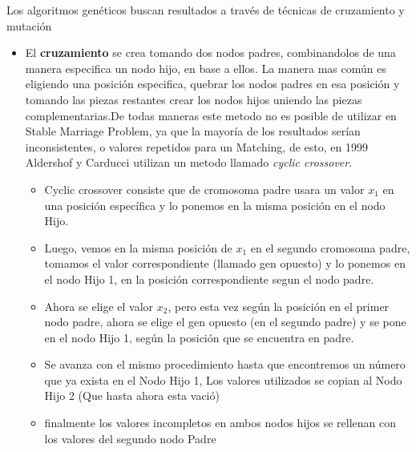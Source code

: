 \documentclass[letter, 10pt]{article}
\begin{document}
Los algoritmos gen\'eticos buscan resultados a trav\'es de t\'ecnicas de cruzamiento y mutaci\'on
\begin{itemize}
\item El \textbf{cruzamiento} se crea tomando dos nodos padres, combinandolos de una manera especifica un nodo hijo, en
base a ellos. La manera mas com\'un es eligiendo una posici\'on especifica, quebrar los nodos padres en esa posici\'on y tomando 
las piezas restantes crear los nodos hijos uniendo las piezas complementarias.\indent De todas maneras este metodo no
es posible de utilizar en Stable Marriage Problem, ya que la mayor\'ia de los resultados ser\'ian inconsistentes, o valores repetidos para 
un Matching, de esto, en 1999 Aldershof y Carducci utilizan un metodo llamado \textit{cyclic crossover}\cite{Aldershof99Gen}.

\begin{itemize}
\item Cyclic crossover consiste que de cromosoma padre usara un valor $x_1$ en una posici\'on espec\'ifica y lo ponemos en la misma 
posici\'on en el nodo Hijo. 
\item Luego, vemos en la misma posici\'on de $x_1$ en el segundo 
cromosoma padre, tomamos el valor correspondiente (llamado gen opuesto) y lo ponemos en el nodo Hijo 1, en la posici\'on correspondiente segun el nodo padre.
\item Ahora se elige el valor $x_2$, pero esta vez seg\'un la posici\'on en el primer nodo padre, ahora se elige el gen opuesto (en el segundo padre) y se pone en el nodo Hijo 1, seg\'un la posici\'on que se encuentra en padre.
\item Se avanza con el mismo procedimiento hasta que encontremos un 
n\'umero que ya exista en el Nodo Hijo 1, Los valores utilizados se copian al Nodo Hijo 2 (Que hasta ahora esta vaci\'o)
\item finalmente los valores incompletos en ambos nodos hijos se rellenan con los valores del segundo nodo Padre 
\end{itemize}


\end{itemize}
\end{document}

